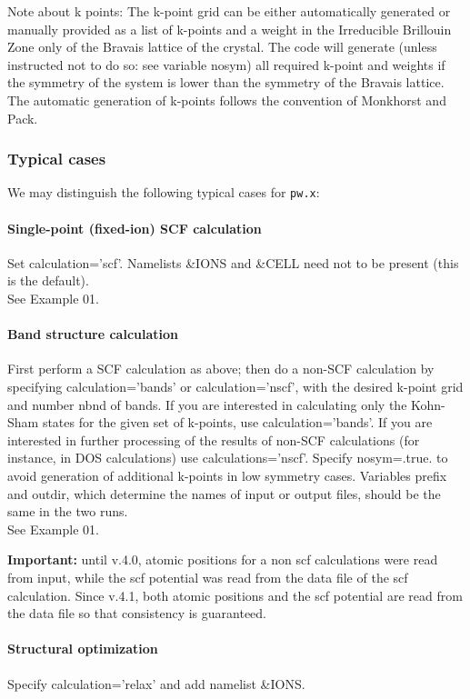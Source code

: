 \documentclass[12pt,a4paper]{article}
\def\pw.x{\texttt{pw.x}}
\begin{document}
Note about k points: The k-point grid can be either automatically generated 
or manually provided as a list of k-points and a weight in the Irreducible
Brillouin Zone only of the Bravais lattice of the crystal. The code will 
generate (unless instructed not to do so: see variable nosym) all
required k-point 
and weights if the symmetry of the system is lower than the symmetry of the
Bravais lattice. The automatic generation of k-points follows the convention
of Monkhorst and Pack.

\subsubsection{Typical cases}
We may distinguish the following typical cases for \pw.x:

\paragraph{Single-point (fixed-ion) SCF calculation} 
Set calculation='scf'.
Namelists \&IONS and \&CELL need not to be present (this is the default).\\
See Example 01.

\paragraph{Band structure calculation}
First perform a SCF calculation as above;
then do a non-SCF calculation by specifying calculation='bands' or
calculation='nscf', with the desired k-point grid and number nbnd
of bands. If you are interested in calculating only the Kohn-Sham states
for the given set of k-points, use calculation='bands'. If you are
interested in further processing of the results of non-SCF calculations
(for instance, in DOS calculations) use calculations='nscf'.
Specify nosym=.true. to avoid generation of additional k-points in
low symmetry cases. Variables prefix and outdir, which determine
the names of input or output files, should be the same in the two runs.\\
See Example 01.

{\bf Important:} until v.4.0, atomic positions for a non scf calculations 
were read from input, while the scf potential was read from the data file
of the scf calculation. Since v.4.1, both atomic positions and the scf
potential are read from the data file so that consistency is guaranteed.

\paragraph{Structural optimization}
Specify calculation='relax' and add namelist \&IONS.
\end{document}

